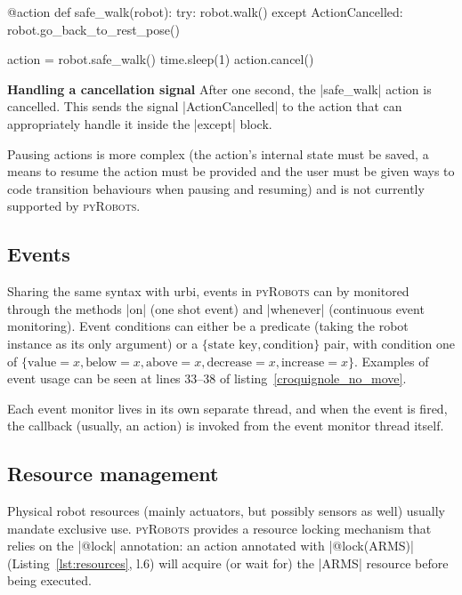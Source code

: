 \documentclass[a4paper, 10pt, conference]{ieeeconf}      %
\newcommand{\pyRobots}{\textsc{pyRobots}}
\begin{document}
\begin{listing}
\begin{pythoncode}
    @action
    def safe_walk(robot):
      try:
        robot.walk()
      except ActionCancelled:
        robot.go_back_to_rest_pose()

    action = robot.safe_walk()
    time.sleep(1)
    action.cancel()
\end{pythoncode}
\caption{\textbf{Handling a cancellation signal} After one second, the
\python|safe_walk| action is cancelled. This sends the signal
\python|ActionCancelled| to the action that can appropriately handle it inside
the \python|except| block.}
\label{lst:signals}
\end{listing}

Pausing actions is more complex (the action's internal state must be saved, a
means to resume the action must be provided and the user must be given ways to
code transition behaviours when pausing and resuming) and is not currently
supported by \pyRobots{}.

\subsection{Events}

Sharing the same syntax with {\sc urbi}, events in \pyRobots{} can by monitored
through the methods \python|on| (one shot event) and \python|whenever|
(continuous event monitoring). Event conditions can either be a predicate
(taking the robot instance as its only argument) or a $\{\text{state
key}, \text{condition}\}$ pair, with condition one of $\{\text{value}=x,
\text{below}=x, \text{above}=x, \text{decrease}=x, \text{increase}=x\}$.
Examples of event usage can be seen at lines 33--38 of
listing~\ref{croquignole_no_move}.

Each event monitor lives in its own separate thread, and when the event is fired,
the callback (usually, an action) is invoked from the event monitor thread
itself.

\subsection{Resource management}

Physical robot resources (mainly actuators, but possibly sensors as
well) usually mandate exclusive use. \pyRobots{} provides a resource
locking mechanism that relies on the \python|@lock| annotation: an action
annotated with \python|@lock(ARMS)| (Listing~\ref{lst:resources}, l.6) will
acquire (or wait for) the \python|ARMS| resource before being executed.
\end{document}
